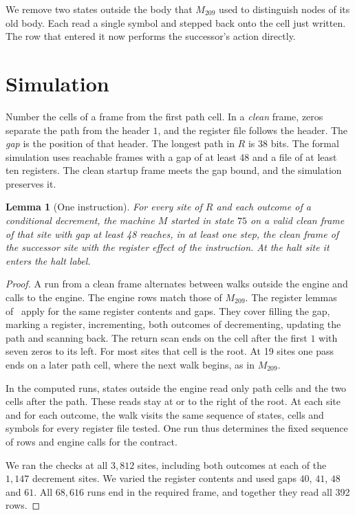 \documentclass[11pt,letterpaper]{article}
\newtheorem{lemma}[theorem]{Lemma}
\begin{document}
We remove two states outside the body that $M_{209}$ used to
distinguish nodes of its old body. Each read a single symbol and
stepped back onto the cell just written. The row that entered it
now performs the successor's action directly.

\section{Simulation}\label{sec:simulation}

Number the cells of a frame from the first path cell. In a
\emph{clean} frame, zeros separate the path from the header $1$, and
the register file follows the header. The \emph{gap} is the position
of that header. The longest path in $R$ is 38 bits. The formal
simulation uses reachable frames with a gap of at least 48 and a
file of at least ten registers. The clean startup frame meets the
gap bound, and the simulation preserves it.

\begin{lemma}[One instruction]\label{lem:contract}
For every site of $R$ and each outcome of a conditional decrement,
the machine $M$ started in state $75$ on a valid clean frame of
that site with gap at least 48 reaches, in at least one step, the clean frame of the
successor site with the register effect of the instruction. At the
halt site it enters the halt label.
\end{lemma}

\begin{proof}
A run from a clean frame alternates between walks outside the engine
and calls to the engine. The engine rows match those of $M_{209}$.
The register lemmas of~\cite[\S3]{pa209} apply for the same register
contents and gaps. They cover filling the gap, marking a register,
incrementing, both outcomes of decrementing, updating the path and
scanning back. The return scan ends on the cell after the first $1$
with seven zeros to its left. For most sites that cell is the root.
At 19 sites one pass ends on a later path cell, where the next walk
begins, as in $M_{209}$.

In the computed runs, states outside the engine read only path
cells and the two cells after the path. These reads stay at or to the
right of the root. At each site and for each outcome, the walk visits
the same sequence of states, cells and symbols for every register
file tested. One run thus determines the fixed sequence of rows
and engine calls for the contract.

We ran the checks at all $3{,}812$ sites, including both outcomes
at each of the $1{,}147$ decrement sites. We varied the register
contents and used gaps $40$, $41$, $48$ and $61$. All $68{,}616$
runs end in the required frame, and together they read all 392
rows.
\end{proof}
\end{document}
